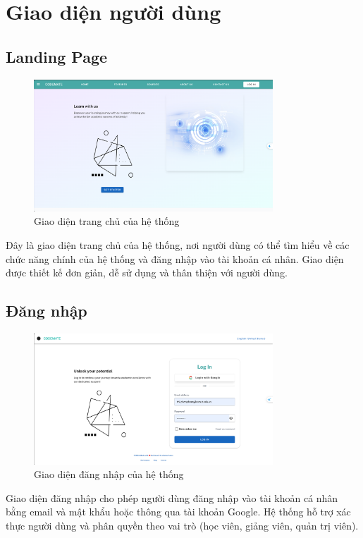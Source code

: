 \chapter{Giao diện người dùng}
\section{Landing Page}
\begin{figure}[H]
    \centering
    \includegraphics[width=0.8\textwidth]{images/CapScreen_Student/LandingPage.png}
    \caption{Giao diện trang chủ của hệ thống}
    \label{fig:landing_page}
\end{figure}
Đây là giao diện trang chủ của hệ thống, nơi người dùng có thể tìm hiểu về các chức năng chính của hệ thống và đăng nhập vào tài khoản cá nhân. Giao diện được thiết kế đơn giản, dễ sử dụng và thân thiện với người dùng.
\section{Đăng nhập}
\begin{figure}[H]
    \centering
    \includegraphics[width=0.8\textwidth]{images/CapScreen_Student/Login.png}
    \caption{Giao diện đăng nhập của hệ thống}
    \label{fig:login_page}
\end{figure}
Giao diện đăng nhập cho phép người dùng đăng nhập vào tài khoản cá nhân bằng email và mật khẩu hoặc thông qua tài khoản Google. Hệ thống hỗ trợ xác thực người dùng và phân quyền theo vai trò (học viên, giảng viên, quản trị viên).
